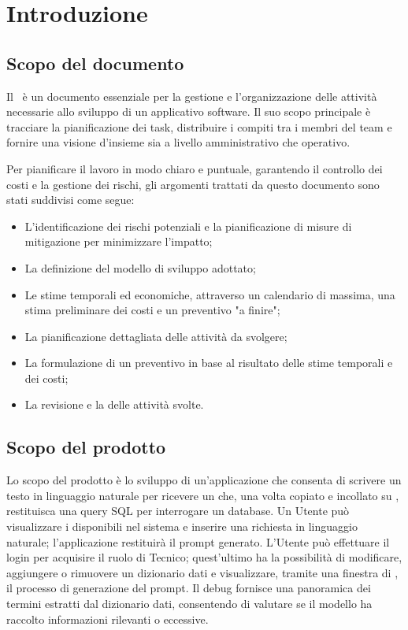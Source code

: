 \section{Introduzione}
\label{sec:introduzione}

\subsection{Scopo del documento}
Il \PdP\ è un documento essenziale per la gestione e l'organizzazione delle attività necessarie allo sviluppo di un applicativo software. Il suo scopo principale è tracciare la pianificazione dei task, distribuire i compiti tra i membri del team e fornire una visione d'insieme sia a livello amministrativo che operativo.

Per pianificare il lavoro in modo chiaro e puntuale, garantendo il controllo dei costi e la gestione dei rischi, gli argomenti trattati da questo documento sono stati suddivisi come segue:
\begin{itemize}
  \item L'identificazione dei rischi potenziali e la pianificazione di misure di mitigazione per minimizzare l'impatto;
  \item La definizione del modello di sviluppo adottato;
  \item Le stime temporali ed economiche, attraverso un calendario di massima, una stima preliminare dei costi e un preventivo "a finire";
  \item La pianificazione dettagliata delle attività da svolgere;
  \item La formulazione di un preventivo in base al risultato delle stime temporali e dei costi;
  \item La revisione e la  delle attività svolte.
\end{itemize}
\subsection{Scopo del prodotto}
Lo scopo del prodotto è lo sviluppo di un'applicazione che consenta di scrivere un testo in linguaggio naturale per ricevere un  che, una volta copiato e incollato su , restituisca una query SQL per interrogare un database. 
Un Utente può visualizzare i  disponibili nel sistema e inserire una richiesta in linguaggio naturale; l'applicazione restituirà il prompt generato. 
L'Utente può effettuare il login per acquisire il ruolo di Tecnico; quest'ultimo ha la possibilità di modificare, aggiungere o rimuovere un dizionario dati e visualizzare, tramite una finestra di , il processo di generazione del prompt. 
Il debug fornisce una panoramica dei termini estratti dal dizionario dati, consentendo di valutare se il modello ha raccolto informazioni rilevanti o eccessive.
